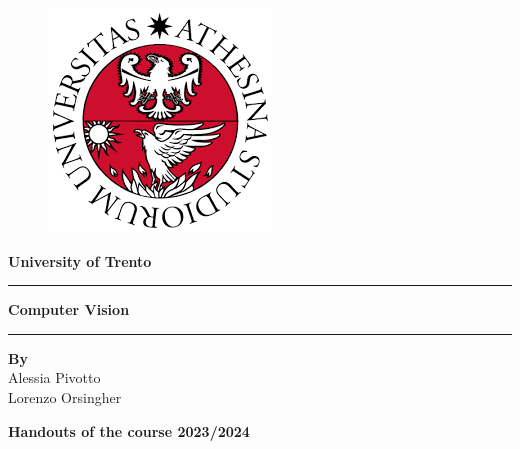 \begin{titlepage}
   \begin{figure}
         \centering
         \includegraphics[scale=0.8]{Figures/Logo.png}
      \end{figure}
      \begin{center}
         \centering
         \vspace*{1cm}
         
         \textbf{\LARGE University of Trento}
         
         \vspace{1cm}
         \rule{\linewidth}{0.5mm}
         \vspace{0.1cm} 
         
         \textbf{\LARGE Computer Vision}
         
         \vspace{0.1cm}
         \rule{\linewidth}{0.5mm}
         \vspace{1cm} 
         
         \textbf{\textbf{By}} \\
         Alessia Pivotto \\ 
         Lorenzo Orsingher

         \vspace{1.5cm}
   \textbf{Handouts of the course 2023/2024}\\      
   \vspace{0.5cm}
           
      \end{center}
   \end{titlepage}